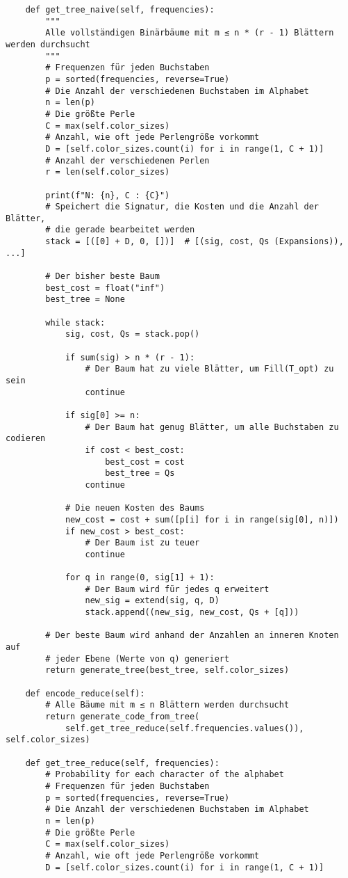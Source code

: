 \documentclass[a4paper,10pt,ngerman]{scrartcl}
\begin{document}
\begin{verbatim}
    def get_tree_naive(self, frequencies):
        """
        Alle vollständigen Binärbäume mit m ≤ n * (r - 1) Blättern werden durchsucht
        """
        # Frequenzen für jeden Buchstaben
        p = sorted(frequencies, reverse=True)
        # Die Anzahl der verschiedenen Buchstaben im Alphabet
        n = len(p)
        # Die größte Perle
        C = max(self.color_sizes)
        # Anzahl, wie oft jede Perlengröße vorkommt
        D = [self.color_sizes.count(i) for i in range(1, C + 1)]
        # Anzahl der verschiedenen Perlen
        r = len(self.color_sizes)

        print(f"N: {n}, C : {C}")
        # Speichert die Signatur, die Kosten und die Anzahl der Blätter,
        # die gerade bearbeitet werden
        stack = [([0] + D, 0, [])]  # [(sig, cost, Qs (Expansions)), ...]

        # Der bisher beste Baum
        best_cost = float("inf")
        best_tree = None

        while stack:
            sig, cost, Qs = stack.pop()

            if sum(sig) > n * (r - 1):
                # Der Baum hat zu viele Blätter, um Fill(T_opt) zu sein
                continue

            if sig[0] >= n:
                # Der Baum hat genug Blätter, um alle Buchstaben zu codieren
                if cost < best_cost:
                    best_cost = cost
                    best_tree = Qs
                continue

            # Die neuen Kosten des Baums
            new_cost = cost + sum([p[i] for i in range(sig[0], n)])
            if new_cost > best_cost:
                # Der Baum ist zu teuer
                continue

            for q in range(0, sig[1] + 1):
                # Der Baum wird für jedes q erweitert
                new_sig = extend(sig, q, D)
                stack.append((new_sig, new_cost, Qs + [q]))

        # Der beste Baum wird anhand der Anzahlen an inneren Knoten auf
        # jeder Ebene (Werte von q) generiert
        return generate_tree(best_tree, self.color_sizes)

    def encode_reduce(self):
        # Alle Bäume mit m ≤ n Blättern werden durchsucht
        return generate_code_from_tree(
            self.get_tree_reduce(self.frequencies.values()), self.color_sizes)

    def get_tree_reduce(self, frequencies):
        # Probability for each character of the alphabet
        # Frequenzen für jeden Buchstaben
        p = sorted(frequencies, reverse=True)
        # Die Anzahl der verschiedenen Buchstaben im Alphabet
        n = len(p)
        # Die größte Perle
        C = max(self.color_sizes)
        # Anzahl, wie oft jede Perlengröße vorkommt
        D = [self.color_sizes.count(i) for i in range(1, C + 1)]


\end{verbatim}
\end{document}
